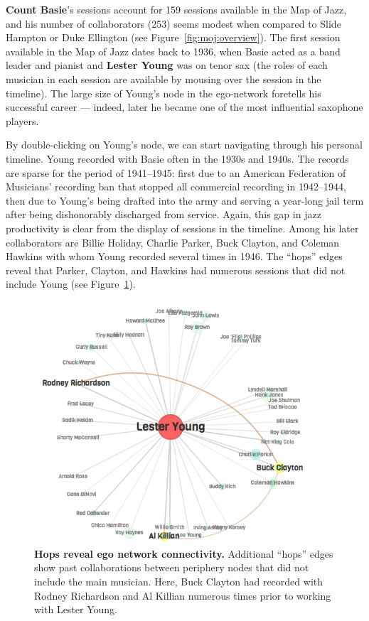 \documentclass[12pt]{cmuthesis}
\begin{document}
  \textbf{Count Basie}'s sessions account for 159 sessions available in the Map of Jazz, and his number of collaborators (253) seems modest when compared to Slide Hampton or Duke Ellington (see Figure~\ref{fig:moj:overview}). The first session available in the Map of Jazz dates back to 1936, when Basie acted as a band leader and pianist and \textbf{Lester Young} was on tenor sax (the roles of each musician in each session are available by mousing over the session in the timeline). The large size of Young's node in the ego-network foretells his successful career --- indeed, later he became one of the most influential saxophone players.

  By double-clicking on Young's node, we can start navigating through his personal timeline. Young recorded with Basie often in the 1930s and 1940s. The records are sparse for the period of 1941--1945: first due to an American Federation of Musicians' recording ban that stopped all commercial recording in 1942--1944, then due to Young's being drafted into the army and serving a year-long jail term after being dishonorably discharged from service. Again, this gap in jazz productivity is clear from the display of sessions in the timeline.  Among his later collaborators are Billie Holiday, Charlie Parker, Buck Clayton, and Coleman Hawkins with whom Young recorded several times in 1946. The ``hops'' edges reveal that Parker, Clayton, and Hawkins had numerous sessions that did not include Young (see Figure~\ref{fig:moj:young}).

  \begin{figure}[htb!]
    \centering
    \includegraphics[width=0.8\linewidth]{figures/lester-young}
    \caption{\textbf{Hops reveal ego network connectivity.} Additional ``hops'' edges show past collaborations between periphery nodes that did not include the main musician. Here, Buck Clayton had recorded with Rodney Richardson and Al Killian numerous times prior to working with Lester Young.}
    \label{fig:moj:young}
  \end{figure}
\end{document}
